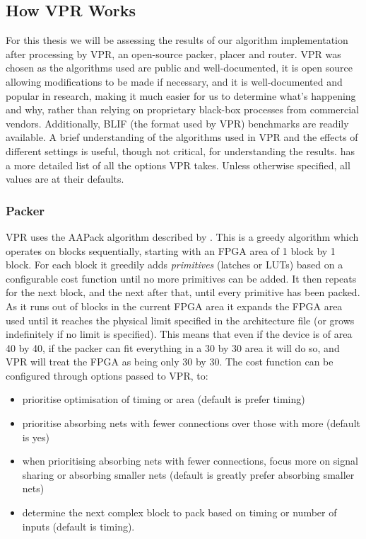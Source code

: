 \documentclass[12pt,final,oneside,a4paper]{dwThesis} %
\begin{document}
   \subsection{How \gls{VPR} Works}
   \label{VPRSection} For this thesis we will be assessing the results
   of our algorithm implementation after processing by \gls{VPR}, an open-source packer, placer and router. \gls{VPR} was chosen as the algorithms
   used are public and well-documented, it is open source allowing
   modifications to be made if necessary, and it is well-documented and popular
   in research, making it much easier for us to determine what's happening and
   why, rather than relying on proprietary black-box processes from commercial
   vendors. Additionally, \gls{BLIF} (the format used by \gls{VPR}) benchmarks
   are readily available.  A brief understanding of the algorithms used in
   \gls{VPR} and the effects of different settings is useful, though not
   critical, for understanding the results. \cite{VPRManual} has a more
   detailed list of all the options \gls{VPR} takes. Unless otherwise
   specified, all values are at their defaults.  \subsubsection{Packer}
   \gls{VPR} uses the AAPack algorithm described by \cite{AAPackThesis}. This
   is a greedy algorithm which operates on blocks sequentially, starting with
   an \gls{FPGA} area of 1 block by 1 block. For each block it greedily adds
   \textit{primitives} (latches or \glspl{LUT}) based on a configurable cost
   function until no more primitives can be added. It then repeats for the next
   block, and the next after that, until every primitive has been packed. As it
   runs out of blocks in the current \gls{FPGA} area it expands the \gls{FPGA}
   area used until it reaches the physical limit specified in the architecture
   file (or grows indefinitely if no limit is specified). This means that even
   if the device is of area 40 by 40, if the packer can fit everything in a 30
   by 30 area it will do so, and \gls{VPR} will treat the \gls{FPGA} as being
   only 30 by 30.  The cost function can be configured through options passed
   to \gls{VPR}, to\cite{VPRManual}: 
   \begin{itemize}

      \item prioritise optimisation of timing or area (default is prefer
         timing)
      \item prioritise absorbing nets with fewer connections over those with
         more (default is yes)
      \item when prioritising absorbing nets with fewer connections, focus more
         on signal sharing or absorbing smaller nets (default is greatly
         prefer absorbing smaller nets)
      \item determine the next complex block to pack based on timing or number
         of inputs (default is timing).  
   \end{itemize}
\end{document}
